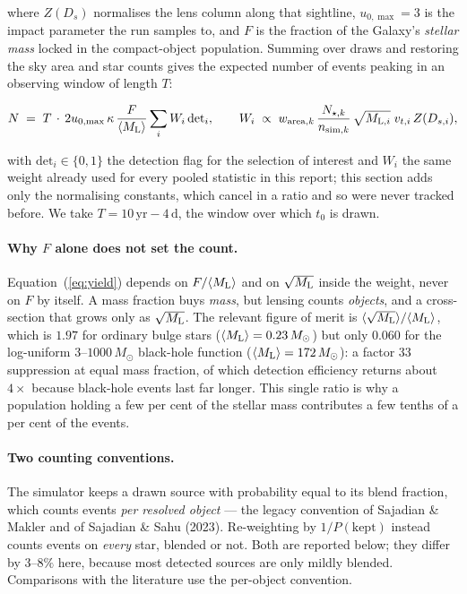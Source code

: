\documentclass[english,10pt,a4paper]{article}
\newcommand{\Ml}{M_{\rm L}}
\newcommand{\Msun}{M_\odot}
\begin{document}
where $Z(D_s)$ normalises the lens column along that sightline, $u_{0,\max}=3$ is the impact
parameter the run samples to, and $F$ is the fraction of the Galaxy's \emph{stellar mass} locked
in the compact-object population. Summing over draws and restoring the sky area and star counts
gives the expected number of events peaking in an observing window of length $T$:

\begin{equation}
N \;=\; T\,\cdot\,2u_{0,\max}\,\kappa\,\frac{F}{\langle \Ml\rangle}
        \sum_i W_i\,\mathrm{det}_i ,
\qquad
W_i \;\propto\; w_{{\rm area},k}\,\frac{N_{\star,k}}{n_{{\rm sim},k}}\,
                \sqrt{M_{{\rm L},i}}\;v_{t,i}\,Z(D_{s,i}),
\label{eq:yield}
\end{equation}

with $\mathrm{det}_i\in\{0,1\}$ the detection flag for the selection of interest and $W_i$ the same
weight already used for every pooled statistic in this report; this section adds only the
normalising constants, which cancel in a ratio and so were never tracked before. We take $T = 10\,\mathrm{yr} - 4\,\mathrm{d}$,
the window over which $t_0$ is drawn.

\paragraph{Why $F$ alone does not set the count.} Equation~(\ref{eq:yield}) depends on
$F/\langle \Ml\rangle$ and on $\sqrt{\Ml}$ inside the weight, never on $F$ by itself. A mass
fraction buys \emph{mass}, but lensing counts \emph{objects}, and a cross-section that grows only
as $\sqrt{\Ml}$. The relevant figure of merit is $\langle\sqrt{\Ml}\rangle/\langle \Ml\rangle$,
which is $1.97$ for ordinary bulge stars ($\langle \Ml\rangle = 0.23\,\Msun$) but only $0.060$ for
the log-uniform $3$--$1000\,\Msun$ black-hole function ($\langle \Ml\rangle = 172\,\Msun$): a
factor $33$ suppression at equal mass fraction, of which detection efficiency returns about
$4\times$ because black-hole events last far longer. This single ratio is why a population holding
a few per cent of the stellar mass contributes a few tenths of a per cent of the events.

\paragraph{Two counting conventions.} The simulator keeps a drawn source with probability equal to
its blend fraction, which counts events \emph{per resolved object} --- the legacy convention of
Sajadian \& Makler and of Sajadian \& Sahu (2023). Re-weighting by $1/P(\text{kept})$ instead
counts events on \emph{every} star, blended or not. Both are reported below; they differ by
$3$--$8\%$ here, because most detected sources are only mildly blended. Comparisons with the
literature use the per-object convention.
\end{document}
